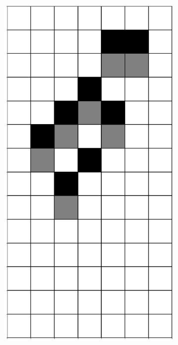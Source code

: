 \documentclass[12pt]{article}
\numberwithin{figure}{section} %
\begin{document}
\begin{figure}[H]
\begin{subfigure}{0.18\textwidth}
     		\includegraphics[width=\linewidth]{Section4/16.4}
     		\subcaption{}
   	\end{subfigure}
      	\newline
   	\setcounter{subfigure}{0}


\end{figure}
\end{document}
